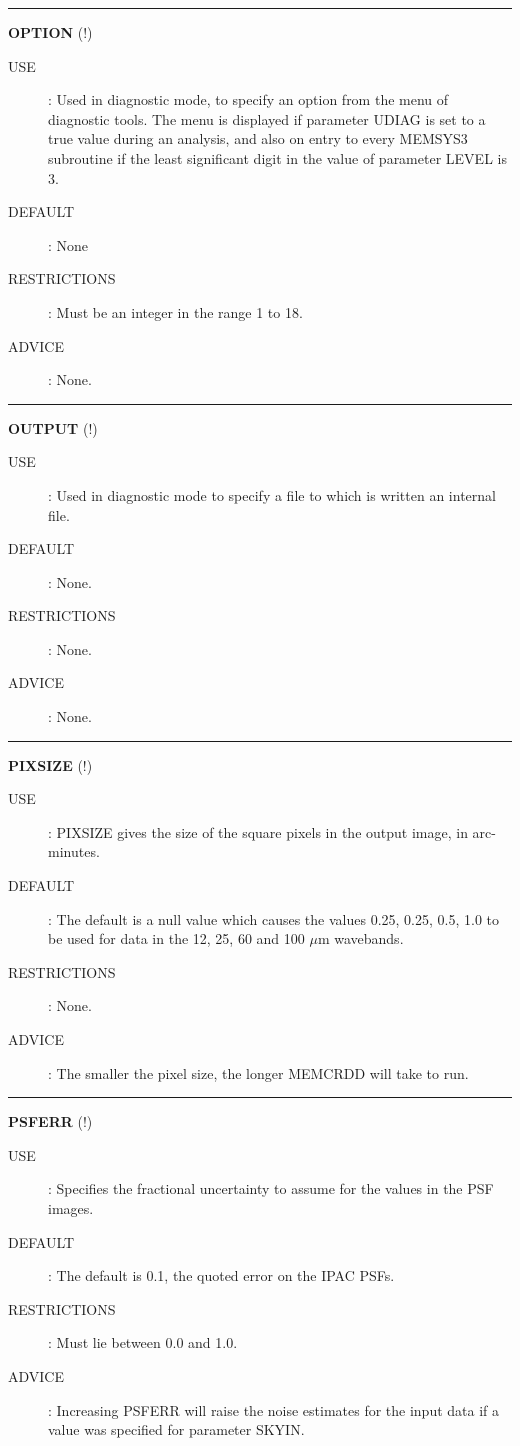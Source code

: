 \rule{\textwidth}{0.3mm}
{\Large {\bf OPTION} (!)}
\begin{description}
\item [USE]:
Used in diagnostic mode, to specify an option from the menu of diagnostic tools.
The menu is displayed if parameter UDIAG is set to a true value during an 
analysis, and also on entry to every MEMSYS3 subroutine if the least significant 
digit in the value of parameter LEVEL is 3.
\item [DEFAULT]:
None
\item [RESTRICTIONS]:
Must be an integer in the range 1 to 18.
\item [ADVICE]:
None.
\end {description}

\rule{\textwidth}{0.3mm}
{\Large {\bf OUTPUT } (!)}
\begin{description}
\item [USE]:
Used in diagnostic mode to specify a file to which is written an internal file.
\item [DEFAULT]:
None.
\item [RESTRICTIONS]:
None.
\item [ADVICE]:
None.\end {description}

\rule{\textwidth}{0.3mm}
{\Large {\bf PIXSIZE } (!)}
\begin{description}
\item [USE]:
PIXSIZE gives the size of the square pixels in the output image, in arc-minutes.
\item [DEFAULT]:
The default is a null value which causes the values 0.25, 0.25, 0.5, 1.0 to be 
used for data in the 12, 25, 60 and 100 $\mu$m wavebands.
\item [RESTRICTIONS]:
None.
\item [ADVICE]:
The smaller the pixel size, the longer MEMCRDD will take to run. 
\end {description}

\rule{\textwidth}{0.3mm}
{\Large {\bf PSFERR} (!)}
\begin{description}
\item [USE]:
Specifies the fractional uncertainty to assume for the values in the PSF images.
\item [DEFAULT]:
The default is 0.1, the quoted error on the IPAC PSFs.
\item [RESTRICTIONS]:
Must lie between 0.0 and 1.0.
\item [ADVICE]:
Increasing PSFERR will raise the noise estimates for the input data if a value 
was specified for parameter SKYIN.
\end {description}

